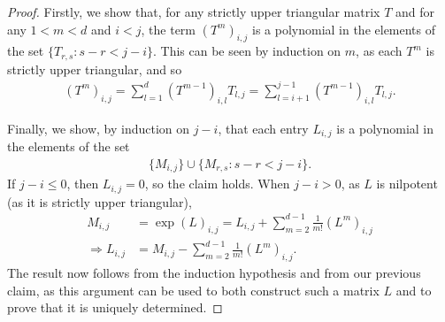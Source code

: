 \begin{proof}
Firstly, we show that, for any strictly upper triangular matrix $T$ and for any $1<m<d$ and $i<j$, the term ${(T^{m})}_{i,j}$ is a polynomial in the elements of the set $\lbrace T_{r,s} : s-r<j-i \rbrace$. This can be seen by induction on $m$, as each $T^{m}$ is strictly upper triangular, and so
\begin{align*}
{(T^{m})}_{i,j} = \sum\limits_{l=1}^{d} {(T^{m-1})}_{i,l} T_{l,j} = \sum\limits_{l=i+1}^{j-1} {(T^{m-1})}_{i,l} T_{l,j} .
\end{align*}

Finally, we show, by induction on $j-i$, that each entry $L_{i,j}$ is a polynomial in the elements of the set
\begin{align*}
\lbrace M_{i,j} \rbrace \cup \lbrace M_{r,s} : s-r < j-i \rbrace .
\end{align*}
If $j-i \leq 0$, then $L_{i,j}=0$, so the claim holds. When $j-i>0$, as $L$ is nilpotent (as it is strictly upper triangular),
\begin{align*}
M_{i,j} &= \exp{(L)}_{i,j} = L_{i,j} + \sum\limits_{m=2}^{d-1} \frac{1}{m!} {(L^{m})}_{i,j} \\ \Rightarrow L_{i,j} &= M_{i,j} - \sum\limits_{m=2}^{d-1} \frac{1}{m!} {(L^{m})}_{i,j} .
\end{align*}
The result now follows from the induction hypothesis and from our previous claim, as this argument can be used to both construct such a matrix $L$ and to prove that it is uniquely determined.
\end{proof}
